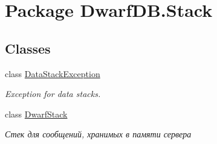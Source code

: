 \hypertarget{namespace_dwarf_d_b_1_1_stack}{
\section{Package DwarfDB.Stack}
\label{namespace_dwarf_d_b_1_1_stack}
}
\subsection*{Classes}
\begin{DoxyCompactItemize}
\item 
class \hyperlink{class_dwarf_d_b_1_1_stack_1_1_data_stack_exception}{DataStackException}
\begin{DoxyCompactList}\small\item\em Exception for data stacks. \item\end{DoxyCompactList}\item 
class \hyperlink{class_dwarf_d_b_1_1_stack_1_1_dwarf_stack}{DwarfStack}
\begin{DoxyCompactList}\small\item\em Стек для сообщений, хранимых в памяти сервера \item\end{DoxyCompactList}\end{DoxyCompactItemize}
